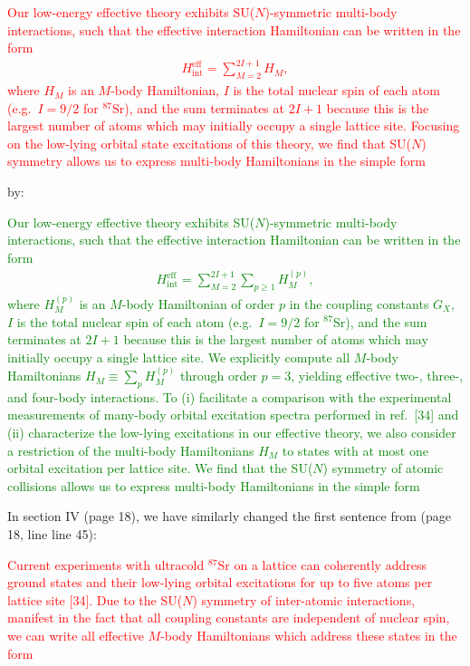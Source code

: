 \documentclass[preprint]{revtex4-1}
\renewcommand{\t}{\text} %
\newcommand{\1}{\mathds{1}}
\newcommand{\red}[1]{\textcolor{red}{#1}}
\newcommand{\green}[1]{\textcolor{green}{#1}}
\begin{document}
\begin{enumerate}
  \red{Our low-energy effective theory exhibits SU($N$)-symmetric
    multi-body interactions, such that the effective interaction
    Hamiltonian can be written in the form
    \begin{align*}
      H_{\t{int}}^{\t{eff}} = \sum_{M=2}^{2I+1} H_M, \tag{9}
    \end{align*}
    where $H_M$ is an $M$-body Hamiltonian, $I$ is the total nuclear
    spin of each atom (e.g.~$I=9/2$ for ${}^{87}$Sr), and the sum
    terminates at $2I+1$ because this is the largest number of atoms
    which may initially occupy a single lattice site.  Focusing on the
    low-lying orbital state excitations of this theory, we find that
    SU($N$) symmetry allows us to express multi-body Hamiltonians in
    the simple form}

  by:

  \green{Our low-energy effective theory exhibits SU($N$)-symmetric
    multi-body interactions, such that the effective interaction
    Hamiltonian can be written in the form
    \begin{align*}
      H_{\t{int}}^{\t{eff}} = \sum_{M=2}^{2I+1} \sum_{p\ge1} H_M^{(p)},
      \tag{9}
    \end{align*}
    where $H_M^{(p)}$ is an $M$-body Hamiltonian of order $p$ in the
    coupling constants $G_X$, $I$ is the total nuclear spin of each
    atom (e.g.~$I=9/2$ for ${}^{87}$Sr), and the sum terminates at
    $2I+1$ because this is the largest number of atoms which may
    initially occupy a single lattice site.  We explicitly compute all
    $M$-body Hamiltonians $H_M\equiv\sum_p H_M^{(p)}$ through order
    $p=3$, yielding effective two-, three-, and four-body
    interactions.  To (i) facilitate a comparison with the
    experimental measurements of many-body orbital excitation spectra
    performed in ref.~[34] and (ii) characterize the low-lying
    excitations in our effective theory, we also consider a
    restriction of the multi-body Hamiltonians $H_M$ to states with at
    most one orbital excitation per lattice site.  We find that the
    SU($N$) symmetry of atomic collisions allows us to express
    multi-body Hamiltonians in the simple form}

  In section IV (page 18), we have similarly changed the first
  sentence from (page 18, line line 45):

  \red{Current experiments with ultracold ${}^{87}$Sr on a lattice can
    coherently address ground states and their low-lying orbital
    excitations for up to five atoms per lattice site [34].  Due to
    the SU($N$) symmetry of inter-atomic interactions, manifest in the
    fact that all coupling constants are independent of nuclear spin,
    we can write all effective $M$-body Hamiltonians which address
    these states in the form}


\end{enumerate}
\end{document}
